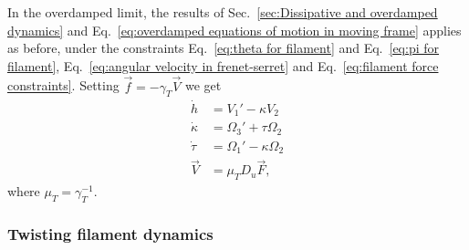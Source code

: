 In the overdamped limit, the results of Sec.~\ref{sec:Dissipative and overdamped dynamics} and Eq.~\ref{eq:overdamped equations of motion in moving frame} applies as before, under the constraints Eq.~\ref{eq:theta for filament} and Eq.~\ref{eq:pi for filament}, Eq.~\ref{eq:angular velocity in frenet-serret} and Eq.~\ref{eq:filament force constraints}. Setting $\vec{f} = - \gamma_T \vec{V}$ we get
\begin{subequations} \label{eq:filament overdamped equtions of motion}
\begin{align}
\dot{h} & = V_1' - \kappa V_2 \\
\dot{\kappa} & = \Omega_3' + \tau \Omega_2 \\
\dot{\tau} & = \Omega_1' - \kappa \Omega_2 \\
\vec{V} & = \mu_T D_u \vec{F},
\end{align}
\end{subequations}
where $\mu_T = \gamma_T^{-1}$.

\subsubsection*{Twisting filament dynamics}

